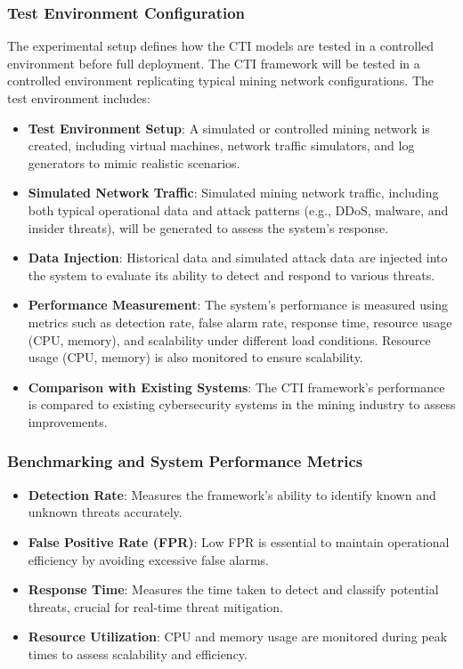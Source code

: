 \documentclass[a4paper,twoside,12pt]{report}
\begin{document}
\subsubsection{Test Environment Configuration}
The experimental setup defines how the CTI models are tested in a controlled environment before full deployment. The CTI framework will be tested in a controlled environment replicating typical mining network configurations. The test environment includes:

\begin{itemize}
    \item \textbf{Test Environment Setup}: A simulated or controlled mining network is created, including virtual machines, network traffic simulators, and log generators to mimic realistic scenarios.
    \item \textbf{Simulated Network Traffic}: Simulated mining network traffic, including both typical operational data and attack patterns (e.g., DDoS, malware, and insider threats), will be generated to assess the system’s response.

    \item \textbf{Data Injection}: Historical data and simulated attack data are injected into the system to evaluate its ability to detect and respond to various threats.
    \item \textbf{Performance Measurement}: The system’s performance is measured using metrics such as detection rate, false alarm rate, response time, resource usage (CPU, memory), and scalability under different load conditions. Resource usage (CPU, memory) is also monitored to ensure scalability.
    \item \textbf{Comparison with Existing Systems}: The CTI framework’s performance is compared to existing cybersecurity systems in the mining industry to assess improvements.
\end{itemize}
\subsubsection{Benchmarking and System Performance Metrics}

\begin{itemize}
    \item \textbf{Detection Rate}: Measures the framework’s ability to identify known and unknown threats accurately.
    
    \item \textbf{False Positive Rate (FPR)}: Low FPR is essential to maintain operational efficiency by avoiding excessive false alarms.
    
    \item \textbf{Response Time}: Measures the time taken to detect and classify potential threats, crucial for real-time threat mitigation.
    
    \item \textbf{Resource Utilization}: CPU and memory usage are monitored during peak times to assess scalability and efficiency.
\end{itemize}
\end{document}
